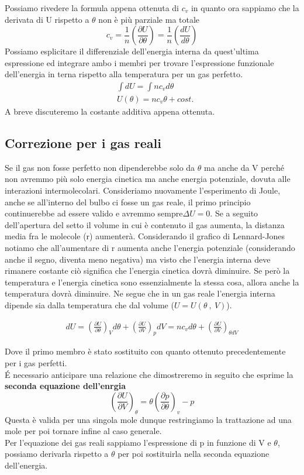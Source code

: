 \documentclass[10pt,a4paper]{article}
\begin{document}
Possiamo rivedere la formula appena ottenuta di \(c_v\) in quanto ora sappiamo che la derivata di U rispetto a $\theta$ non è più parziale ma totale
\[c_v =\frac{1}{n}\left(\frac{\partial U}{\partial\theta}\right)=\frac{1}{n}\left(\frac{dU}{d\theta}\right)\]
Possiamo esplicitare il differenziale dell'energia interna da quest'ultima espressione ed integrare ambo i membri per trovare l'espressione funzionale dell'energia in terna rispetto alla temperatura per un gas perfetto.
\begin{align*} 
	&\int dU = \int n c_v d\theta\\
	&U(\theta) = n c_v \theta + cost.
\end{align*} 
A breve discuteremo la costante additiva appena ottenuta.
\subsection{Correzione per i gas reali}
Se il gas non fosse perfetto non dipenderebbe solo da $\theta$ ma anche da V perché non avremmo più solo energia cinetica ma anche energia potenziale, dovuta alle interazioni intermolecolari. Consideriamo nuovamente l'esperimento di Joule, anche se all'interno del bulbo ci fosse un gas reale, il primo principio continuerebbe ad essere valido e avremmo sempre\(\Delta U = 0\). Se a seguito dell'apertura del setto il volume in cui è contenuto il gas aumenta, la distanza media fra le molecole (r) aumenterà. Considerando il grafico di Lennard-Jones notiamo che all'aumentare di r aumenta anche l'energia potenziale (considerando anche il segno, diventa meno negativa) ma visto che l'energia interna deve rimanere costante ciò significa che l'energia cinetica dovrà diminuire. Se però la temperatura e l'energia cinetica sono essenzialmente la stessa cosa, allora anche la temperatura dovrà diminuire. Ne segue che in un gas reale l'energia interna dipende sia dalla temperatura che dal volume (\(U = U(\theta\ ,\ V)\)). 

\begin{align*} 
	dU = \left(\frac{\partial U}{\partial \theta}\right)_V d\theta + \left(\frac{\partial U}{\partial V}\right)_p dV = n c_v d\theta +\left(\frac{\partial U}{\partial V}\right)_{\theta dV}
\end{align*} 

Dove il primo membro è stato sostituito con quanto ottenuto precedentemente per i gas perfetti.\\
\'{E} necessario anticipare una relazione che dimostreremo in seguito che esprime la \textbf{seconda equazione dell'enrgia}
\[ \left(\frac{\partial U}{\partial V}\right)_{\theta} = \theta \left(\frac{\partial p}{\partial \theta}\right)_v - p \]
Questa è valida per una singola mole dunque restringiamo la trattazione ad una mole per poi tornare infine al caso generale.\\
Per l'equazione dei gas reali sappiamo l'espressione di p in funzione di V e \(\theta\), possiamo derivarla rispetto a $\theta$ per poi sostituirla nella seconda equazione dell'energia. 
\end{document}
